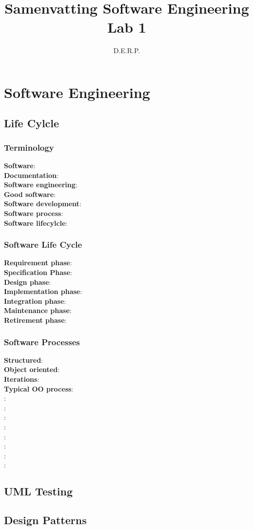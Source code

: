 \documentclass[10pt,a4paper]{report}
\author{D.E.R.P.}
\title{Samenvatting Software Engineering Lab 1}
\begin{document}

\maketitle
\tableofcontents




%

\chapter{Software Engineering}
\section{Life Cylcle}
\subsection{Terminology}
\textbf{Software}:  \\
\textbf{Documentation}: \\
\textbf{Software engineering}: \\
\textbf{Good software}: \\
\textbf{Software development}: \\
\textbf{Software process}: \\
\textbf{Software lifecylcle}: \\
\subsection{Software Life Cycle}
\textbf{Requirement phase}: \\
\textbf{Specification Phase}: \\
\textbf{Design phase}: \\
\textbf{Implementation phase}: \\
\textbf{Integration phase}: \\
\textbf{Maintenance phase}: \\
\textbf{Retirement phase}: \\
\subsection{Software Processes}
\textbf{Structured}: \\
\textbf{Object oriented}: \\
\textbf{Iterations}: \\
\textbf{Typical OO process}: \\
\textbf{}: \\
\textbf{}: \\
\textbf{}: \\
\textbf{}: \\
\textbf{}: \\
\textbf{}: \\
\textbf{}: \\
\textbf{}: \\

\section{UML Testing}
\section {Design Patterns}




\end{document}

